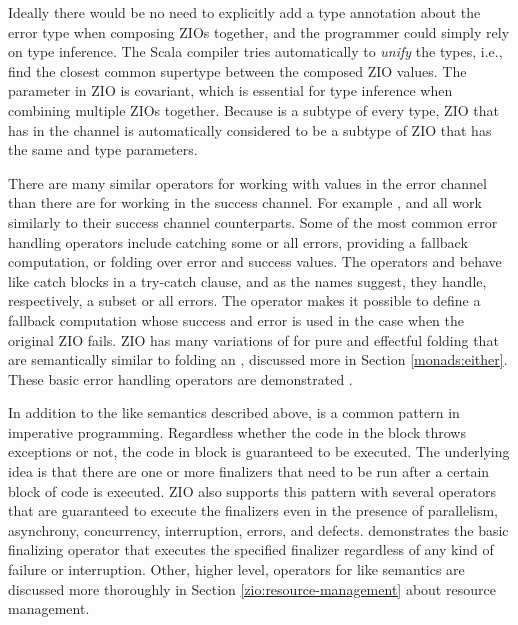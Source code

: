 

Ideally there would be no need to explicitly add a type annotation about the error type when composing ZIOs together, and the programmer could simply rely on type inference. The Scala compiler tries automatically to \emph{unify} the types, i.e., find the closest common supertype between the composed ZIO values. The  parameter in ZIO is covariant, which is essential for type inference when combining multiple ZIOs together. Because  is a subtype of every type, ZIO that has  in the  channel is automatically considered to be a subtype of ZIO that has the same  and  type parameters.

There are many similar operators for working with values in the error channel than there are for working in the success channel. For example ,  and  all work similarly to their success channel counterparts. Some of the most common error handling operators include catching some or all errors, providing a fallback computation, or folding over error and success values. The operators  and  behave like catch blocks in a try-catch clause, and as the names suggest, they handle, respectively, a subset or all errors. The  operator makes it possible to define a fallback computation whose success and error is used in the case when the original ZIO fails. ZIO has many variations of  for pure and effectful folding that are semantically similar to folding an , discussed more in Section \ref{monads:either}. These basic error handling operators are demonstrated .



In addition to the  like semantics described above,  is a common pattern in imperative programming. Regardless whether the code in the  block throws exceptions or not, the code in  block is guaranteed to be executed. The underlying idea is that there are one or more finalizers that need to be run after a certain block of code is executed. ZIO also supports this pattern with several operators that are guaranteed to execute the finalizers even in the presence of parallelism, asynchrony, concurrency, interruption, errors, and defects.  demonstrates the basic finalizing operator  that executes the specified finalizer regardless of any kind of failure or interruption. Other, higher level, operators for  like semantics are discussed more thoroughly in Section \ref{zio:resource-management} about resource management.

